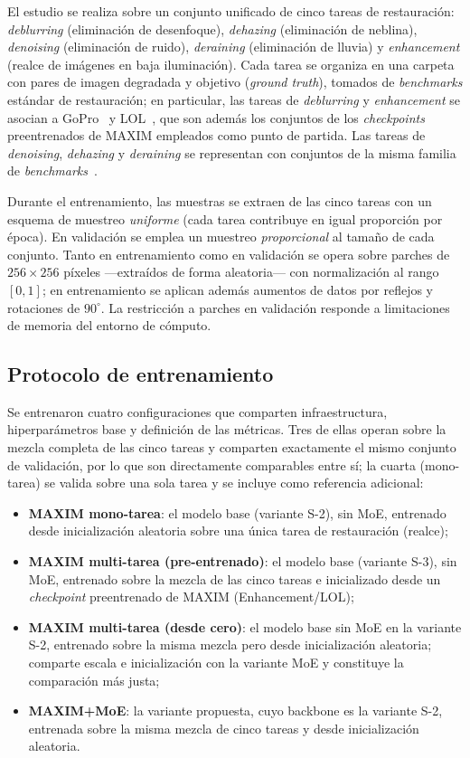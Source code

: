 \documentclass[aps,prl,twocolumn,groupedaddress]{revtex4-2}
\begin{document}
El estudio se realiza sobre un conjunto unificado de cinco tareas de restauración: \textit{deblurring} (eliminación de desenfoque), \textit{dehazing} (eliminación de neblina), \textit{denoising} (eliminación de ruido), \textit{deraining} (eliminación de lluvia) y \textit{enhancement} (realce de imágenes en baja iluminación). Cada tarea se organiza en una carpeta con pares de imagen degradada y objetivo (\textit{ground truth}), tomados de \textit{benchmarks} estándar de restauración; en particular, las tareas de \textit{deblurring} y \textit{enhancement} se asocian a GoPro~\cite{nah2017gopro} y LOL~\cite{wei2018lol}, que son además los conjuntos de los \textit{checkpoints} preentrenados de MAXIM empleados como punto de partida. Las tareas de \textit{denoising}, \textit{dehazing} y \textit{deraining} se representan con conjuntos de la misma familia de \textit{benchmarks}~\cite{abdelhamed2018sidd,li2019reside,fu2017derain}.

Durante el entrenamiento, las muestras se extraen de las cinco tareas con un esquema de muestreo \emph{uniforme} (cada tarea contribuye en igual proporción por época). En validación se emplea un muestreo \emph{proporcional} al tamaño de cada conjunto. Tanto en entrenamiento como en validación se opera sobre parches de $256\times 256$ píxeles ---extraídos de forma aleatoria--- con normalización al rango $[0,1]$; en entrenamiento se aplican además aumentos de datos por reflejos y rotaciones de $90^\circ$. La restricción a parches en validación responde a limitaciones de memoria del entorno de cómputo.

\subsection{Protocolo de entrenamiento}

Se entrenaron cuatro configuraciones que comparten infraestructura, hiperparámetros base y definición de las métricas. Tres de ellas operan sobre la mezcla completa de las cinco tareas y comparten exactamente el mismo conjunto de validación, por lo que son directamente comparables entre sí; la cuarta (mono-tarea) se valida sobre una sola tarea y se incluye como referencia adicional:
\begin{itemize}
    \item \textbf{MAXIM mono-tarea}: el modelo base (variante S-2), sin MoE, entrenado desde inicialización aleatoria sobre una única tarea de restauración (realce);
    \item \textbf{MAXIM multi-tarea (pre-entrenado)}: el modelo base (variante S-3), sin MoE, entrenado sobre la mezcla de las cinco tareas e inicializado desde un \textit{checkpoint} preentrenado de MAXIM (Enhancement/LOL);
    \item \textbf{MAXIM multi-tarea (desde cero)}: el modelo base sin MoE en la variante S-2, entrenado sobre la misma mezcla pero desde inicialización aleatoria; comparte escala e inicialización con la variante MoE y constituye la comparación más justa;
    \item \textbf{MAXIM+MoE}: la variante propuesta, cuyo backbone es la variante S-2, entrenada sobre la misma mezcla de cinco tareas y desde inicialización aleatoria.
\end{itemize}
\end{document}

